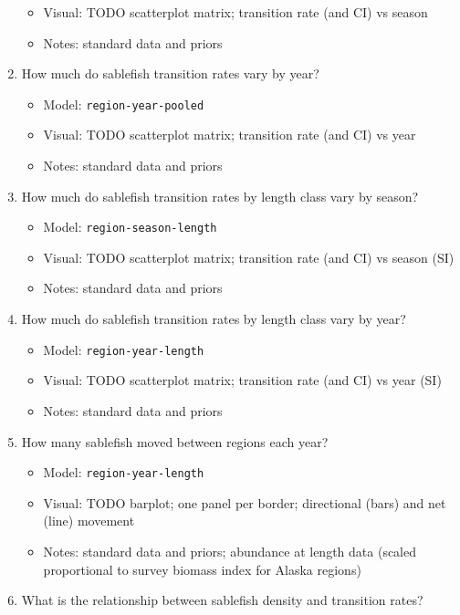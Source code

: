 \documentclass{article}
\begin{document}
\begin{enumerate}
\begin{itemize}
            \item Visual: TODO scatterplot matrix; transition rate (and CI) vs season  
            \item Notes: standard data and priors
        \end{itemize}    
    \item How much do sablefish transition rates vary by year?
        \begin{itemize}
            \item Model: \texttt{region-year-pooled}
            \item Visual: TODO scatterplot matrix; transition rate (and CI) vs year  
            \item Notes: standard data and priors
        \end{itemize}    
    \item How much do sablefish transition rates by length class vary by season?
        \begin{itemize}
            \item Model: \texttt{region-season-length}
            \item Visual: TODO scatterplot matrix; transition rate (and CI) vs season (SI)
            \item Notes: standard data and priors
        \end{itemize}
    \item How much do sablefish transition rates by length class vary by year?
        \begin{itemize}
            \item Model: \texttt{region-year-length}
            \item Visual: TODO scatterplot matrix; transition rate (and CI) vs year (SI) 
            \item Notes: standard data and priors
        \end{itemize} 
    \item How many sablefish moved between regions each year?
        \begin{itemize}
            \item Model: \texttt{region-year-length}
            \item Visual: TODO barplot; one panel per border; directional (bars) and net (line) movement
            \item Notes: standard data and priors; abundance at length data (scaled proportional to survey biomass index for Alaska regions)
        \end{itemize}    
    \item What is the relationship between sablefish density and transition rates?

\end{enumerate}
\end{document}
